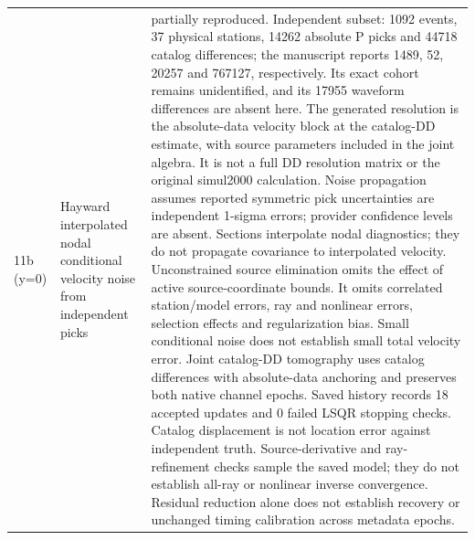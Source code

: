 \begin{longtable}{>{\raggedright\arraybackslash}p{}>{\raggedright\arraybackslash}p{}>{\raggedright\arraybackslash}p{}}
11b (y=0) & Hayward interpolated nodal conditional velocity noise from independent picks & partially reproduced. Independent subset: 1092 events, 37 physical stations, 14262 absolute P picks and 44718 catalog differences; the manuscript reports 1489, 52, 20257 and 767127, respectively. Its exact cohort remains unidentified, and its 17955 waveform differences are absent here. The generated resolution is the absolute-data velocity block at the catalog-DD estimate, with source parameters included in the joint algebra. It is not a full DD resolution matrix or the original simul2000 calculation. Noise propagation assumes reported symmetric pick uncertainties are independent 1-sigma errors; provider confidence levels are absent. Sections interpolate nodal diagnostics; they do not propagate covariance to interpolated velocity. Unconstrained source elimination omits the effect of active source-coordinate bounds. It omits correlated station/model errors, ray and nonlinear errors, selection effects and regularization bias. Small conditional noise does not establish small total velocity error. Joint catalog-DD tomography uses catalog differences with absolute-data anchoring and preserves both native channel epochs. Saved history records 18 accepted updates and 0 failed LSQR stopping checks. Catalog displacement is not location error against independent truth. Source-derivative and ray-refinement checks sample the saved model; they do not establish all-ray or nonlinear inverse convergence. Residual reduction alone does not establish recovery or unchanged timing calibration across metadata epochs.\\

\end{longtable}
